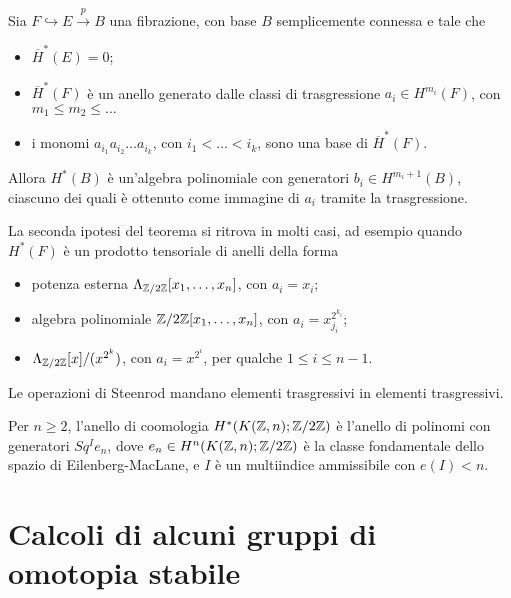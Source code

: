 
\begin{thm}[Borel]
	Sia $F \hookrightarrow E \xrightarrow{p} B$ una fibrazione,
	con base $B$ semplicemente connessa e tale che
	\begin{itemize}
		\item $\overline{H}^{*}(E) = 0$;
		\item $\overline{H}^{*}(F)$ è un anello generato 
		dalle classi di trasgressione $a_{i} \in H^{m_{i}}(F)$,
		con $m_{1} \le m_{2} \le \dots$
		\item i monomi $a_{i_{1}}a_{i_{2}} \dots a_{i_{k}}$, con $i_{1} < \dots < i_{k}$,
		sono una base di  $\overline{H}^{*}(F)$.
	\end{itemize}
	Allora $H^{*}(B)$ è un'algebra polinomiale con generatori $b_{i} \in H^{m_{i}+1}(B)$,
	ciascuno dei quali è ottenuto come immagine di $a_{i}$ tramite la trasgressione.
\end{thm}

\begin{oss}
	La seconda ipotesi del teorema si ritrova in molti casi,
	ad esempio quando $H^{*}(F)$ è un prodotto tensoriale di anelli della forma
	\begin{itemize}
		\item potenza esterna $\Lambda_{{\mathbb Z}/2{\mathbb Z}}[x_{1}, \dots, x_{n}]$,
		con $a_{i} = x_{i}$;
		\item algebra polinomiale ${\mathbb Z}/2{\mathbb Z}[x_{1}, \dots, x_{n}]$, con 
		$a_{i}=x_{j_{i}}^{2^{k_{i}}}$;
		\item  $\Lambda_{{\mathbb Z}/2{\mathbb Z}}[x]/(x^{2^{k}})$, con $a_{i} = x^{2^{i}}$,
		per qualche $1 \le i \le n-1$.
	\end{itemize}
\end{oss}

\begin{oss}
	Le operazioni di Steenrod mandano elementi trasgressivi in elementi trasgressivi.
\end{oss}

\begin{thm}
	Per $n \ge 2$, l'anello di coomologia $H^{*}(K({\mathbb Z},n);{\mathbb Z}/2{\mathbb Z})$
	è l'anello di polinomi con generatori $Sq^{I}e_{n}$,
	dove $e_{n} \in H^{n}(K({\mathbb Z},n);{\mathbb Z}/2{\mathbb Z})$ è la classe fondamentale dello
	spazio di Eilenberg-MacLane, e $I$ è un multiindice ammissibile con $e(I) < n$.
\end{thm}

\section{Calcoli di alcuni gruppi di omotopia stabile}

